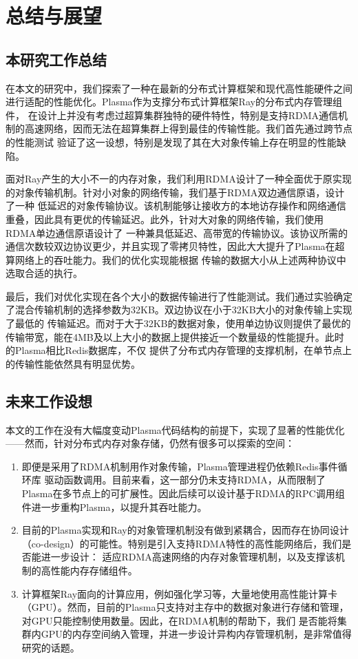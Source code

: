 \chapter{总结与展望}

\section{本研究工作总结}

在本文的研究中，我们探索了一种在最新的分布式计算框架和现代高性能硬件之间进行适配的性能优化。Plasma作为支撑分布式计算框架Ray的分布式内存管理组件，
在设计上并没有考虑过超算集群独特的硬件特性，特别是支持RDMA通信机制的高速网络，因而无法在超算集群上得到最佳的传输性能。我们首先通过跨节点的性能测试
验证了这一设想，特别是发现了其在大对象传输上存在明显的性能缺陷。

面对Ray产生的大小不一的内存对象，我们利用RDMA设计了一种全面优于原实现的对象传输机制。针对小对象的网络传输，我们基于RDMA双边通信原语，设计了一种
低延迟的对象传输协议。该机制能够让接收方的本地访存操作和网络通信重叠，因此具有更优的传输延迟。此外，针对大对象的网络传输，我们使用RDMA单边通信原语设计了
一种兼具低延迟、高带宽的传输协议。该协议所需的通信次数较双边协议更少，并且实现了零拷贝特性，因此大大提升了Plasma在超算网络上的吞吐能力。我们的优化实现能根据
传输的数据大小从上述两种协议中选取合适的执行。

最后，我们对优化实现在各个大小的数据传输进行了性能测试。我们通过实验确定了混合传输机制的选择参数为32KB。双边协议在小于32KB大小的对象传输上实现了最低的
传输延迟。而对于大于32KB的数据对象，使用单边协议则提供了最优的传输带宽，能在4MB及以上大小的数据上提供接近一个数量级的性能提升。此时的Plasma相比Redis数据库，不仅
提供了分布式内存管理的支撑机制，在单节点上的传输性能依然具有明显优势。

\section{未来工作设想}

本文的工作在没有大幅度变动Plasma代码结构的前提下，实现了显著的性能优化——然而，针对分布式内存对象存储，仍然有很多可以探索的空间：

\begin{enumerate}
	\item 即便是采用了RDMA机制用作对象传输，Plasma管理进程仍依赖Redis事件循环库\cite{ae}
	驱动函数调用。目前来看，这一部分仍未支持RDMA，从而限制了Plasma在多节点上的可扩展性。因此后续可以设计基于RDMA的RPC调用组件进一步重构Plasma，以提升其吞吐能力。
	\item 目前的Plasma实现和Ray的对象管理机制\cite{wang2021ownership}没有做到紧耦合，因而存在协同设计（co-design）的可能性。特别是引入支持RDMA特性的高性能网络后，我们是否能进一步设计：
	适应RDMA高速网络的内存对象管理机制，以及支撑该机制的高性能内存存储组件。
	\item 计算框架Ray面向的计算应用，例如强化学习等，大量地使用高性能计算卡（GPU）。然而，目前的Plasma只支持对主存中的数据对象进行存储和管理，对GPU只能控制使用数量。因此，在RDMA机制的帮助下，我们
	是否能将集群内GPU的内存空间纳入管理，并进一步设计异构内存管理机制，是非常值得研究的话题。
\end{enumerate}